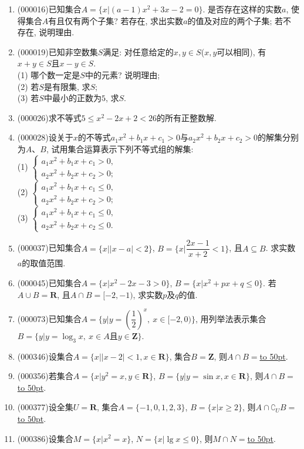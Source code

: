 \documentclass[10pt,a4paper]{article}
\newcommand{\blank}[1]{\underline{\hbox to #1pt{}}}
\begin{document}
\begin{enumerate}[1.]
\item {\tiny (000016)}已知集合$A=\{x|(a-1)x^2+3x-2=0\}$. 是否存在这样的实数$a$, 使得集合$A$有且仅有两个子集? 若存在, 求出实数$a$的值及对应的两个子集; 若不存在, 说明理由.
\item {\tiny (000019)}已知非空数集$S$满足: 对任意给定的$x,y\in S$($x,y$可以相同), 有$x+y\in S$且$x-y\in S$.\\
(1) 哪个数一定是$S$中的元素? 说明理由;\\
(2) 若$S$是有限集, 求$S$;\\
(3) 若$S$中最小的正数为$5$, 求$S$.
\item {\tiny (000026)}求不等式$5\le x^2-2x+2<26$的所有正整数解.
\item {\tiny (000028)}设关于$x$的不等式$a_1x^2+b_1x+c_1>0$与$a_2x^2+b_2x+c_2>0$的解集分别为$A$、$B$,
试用集合运算表示下列不等式组的解集:\\
(1) $\begin{cases} a_1x^2+b_1x+c_1>0, \\ a_2x^2+b_2x+c_2>0;\end{cases}$\\
(2) $\begin{cases} a_1x^2+b_1x+c_1\le 0, \\ a_2x^2+b_2x+c_2>0;\end{cases}$\\
(3) $\begin{cases} a_1x^2+b_1x+c_1\le 0, \\ a_2x^2+b_2x+c_2\le 0.\end{cases}$
\item {\tiny (000037)}已知集合$A=\{x||x-a|<2\}$, $B=\{x|\dfrac{2x-1}{x+2}<1\}$, 且$A\subseteq B$. 求实数$a$的取值范围.
\item {\tiny (000045)}已知集合$A=\{x|x^2-2x-3>0\}$, $B=\{x|x^2+px+q\le 0\}$. 若$A\cup B=\mathbf{R}$, 且$A\cap B=[-2,-1)$, 求实数$p$及$q$的值.
\item {\tiny (000073)}已知集合$A=\{y|y=(\dfrac 12)^x,\  x\in [-2, 0)\}$, 用列举法表示集合$B=\{y|y=\log_3x,\  x\in A\text{且}y\in \mathbf{Z}\}$.
\item {\tiny (000346)}设集合$A=\{x||x-2|<1,x\in \mathbf{R}\}$, 集合$B=\mathbf{Z}$, 则$A\cap B=$\blank{50}.
\item {\tiny (000356)}若集合$A=\{x|y^2=x,y\in \mathbf{R}\}$, $B=\{y|y=\sin x,x\in \mathbf{R}\}$, 则$A\cap B=$\blank{50}.
\item {\tiny (000377)}设全集$U=\mathbf{R}$, 集合$A=\{-1,0,1,2,3\}$, $B=\{x|x\ge 2\}$, 则$A\cap {\complement_U}B=$\blank{50}.
\item {\tiny (000386)}设集合$M=\{x|x^2=x\}$, $N=\{x|\lg x\le 0\}$, 则$M\cap N=$\blank{50}.

\end{enumerate}
\end{document}
